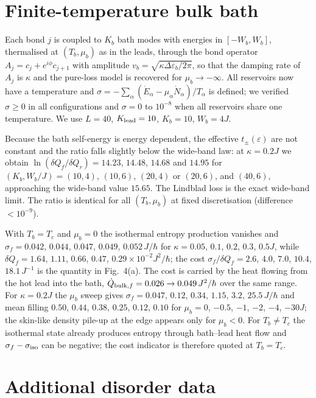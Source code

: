 \documentclass[reprint,aps,prl,superscriptaddress,nofootinbib,floatfix]{revtex4-2}
\newcommand{\dQ}{\delta Q}
\begin{document}
\section{Finite-temperature bulk bath}
\label{sec:bath}

Each bond $j$ is coupled to $K_b$ bath modes with energies in $[-W_b,W_b]$, thermalised at $(T_b,\mu_b)$ as in the leads, through the bond operator $A_j=c_j+e^{i\phi}c_{j+1}$ with amplitude $v_b=\sqrt{\kappa\Delta\varepsilon_b/2\pi}$, so that the damping rate of $A_j$ is $\kappa$ and the pure-loss model is recovered for $\mu_b\to-\infty$. All reservoirs now have a temperature and $\sigma=-\sum_\alpha(\dot E_\alpha-\mu_\alpha\dot N_\alpha)/T_\alpha$ is defined; we verified $\sigma\ge0$ in all configurations and $\sigma=0$ to $10^{-8}$ when all reservoirs share one temperature. We use $L=40$, $K_{\rm lead}=10$, $K_b=10$, $W_b=4J$.

Because the bath self-energy is energy dependent, the effective $t_\pm(\varepsilon)$ are not constant and the ratio falls slightly below the wide-band law: at $\kappa=0.2J$ we obtain $\ln(\dQ_f/\dQ_r)=14.23$, $14.48$, $14.68$ and $14.95$ for $(K_b,W_b/J)=(10,4)$, $(10,6)$, $(20,4)$ or $(20,6)$, and $(40,6)$, approaching the wide-band value $15.65$. The Lindblad loss is the exact wide-band limit. The ratio is identical for all $(T_b,\mu_b)$ at fixed discretisation (difference $<10^{-9}$).

With $T_b=T_c$ and $\mu_b=0$ the isothermal entropy production vanishes and $\sigma_f=0.042$, $0.044$, $0.047$, $0.049$, $0.052\,J/\hbar$ for $\kappa=0.05$, $0.1$, $0.2$, $0.3$, $0.5J$, while $\dQ_f=1.64$, $1.11$, $0.66$, $0.47$, $0.29\times10^{-2}J^2/\hbar$; the cost $\sigma_f/\dQ_f=2.6$, $4.0$, $7.0$, $10.4$, $18.1\,J^{-1}$ is the quantity in Fig.~4(a). The cost is carried by the heat flowing from the hot lead into the bath, $\dot Q_{{\rm bulk},f}=0.026\to0.049\,J^2/\hbar$ over the same range. For $\kappa=0.2J$ the $\mu_b$ sweep gives $\sigma_f=0.047$, $0.12$, $0.34$, $1.15$, $3.2$, $25.5\,J/\hbar$ and mean filling $0.50$, $0.44$, $0.38$, $0.25$, $0.12$, $0.10$ for $\mu_b=0$, $-0.5$, $-1$, $-2$, $-4$, $-30J$; the skin-like density pile-up at the edge appears only for $\mu_b<0$. For $T_b\neq T_c$ the isothermal state already produces entropy through bath--lead heat flow and $\sigma_f-\sigma_{\rm iso}$ can be negative; the cost indicator is therefore quoted at $T_b=T_c$.

\section{Additional disorder data}
\label{sec:disorder}
\end{document}
